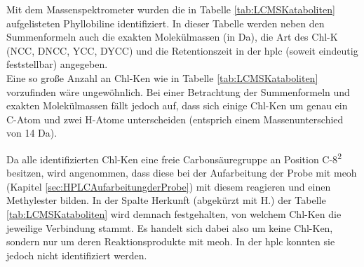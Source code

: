 Mit dem Massenspektrometer wurden die in Tabelle \ref{tab:LCMSKataboliten} aufgelisteten Phyllobiline identifiziert. In dieser Tabelle werden neben den Summenformeln auch die exakten Molekülmassen (in Da), die Art des \gls{Chl-K} (NCC, DNCC, YCC, DYCC) und die Retentionszeit in der \gls{hplc} (soweit eindeutig feststellbar) angegeben. \\

Eine so große Anzahl an \gls{Chl-K}en wie in Tabelle \ref{tab:LCMSKataboliten} vorzufinden wäre ungewöhnlich. Bei einer Betrachtung der Summenformeln und exakten Molekülmassen fällt jedoch auf, dass sich einige \gls{Chl-K}en um genau ein C-Atom und zwei H-Atome unterscheiden (entsprich einem Massenunterschied von 14 Da). 

Da alle identifizierten \gls{Chl-K}en eine freie Carbonsäuregruppe an Position C-8\textsuperscript{2} besitzen, wird angenommen, dass diese bei der Aufarbeitung der Probe mit \gls{meoh} (Kapitel \ref{sec:HPLCAufarbeitungderProbe}) mit diesem reagieren und einen Methylester bilden. In der Spalte Herkunft (abgekürzt mit H.) der Tabelle \ref{tab:LCMSKataboliten} wird demnach festgehalten, von welchem \gls{Chl-K}en die jeweilige Verbindung stammt. Es handelt sich dabei also um keine \gls{Chl-K}en, sondern nur um deren Reaktionsprodukte mit \gls{meoh}. In der \gls{hplc} konnten sie jedoch nicht identifiziert werden. \\

